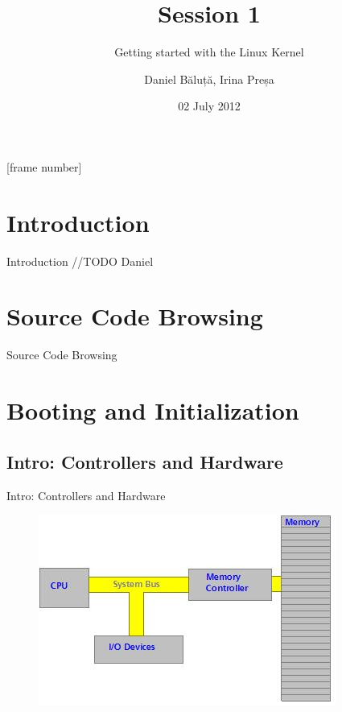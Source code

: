 \documentclass{workshop}
\title[Sesssion 1]{Session 1}
\subtitle{Getting started with the Linux Kernel}
\author{Daniel Băluță, Irina Preșa}
\date{02 July 2012}
\begin{document}
[frame number]

\frame{\titlepage}

\section{Introduction}

\begin{frame}{Introduction}
//TODO Daniel
\end{frame}

\section{Source Code Browsing}

\begin{frame}{Source Code Browsing}
\end{frame}

\section{Booting and Initialization}
\subsection{Intro: Controllers and Hardware}
\begin{frame}{Intro: Controllers and Hardware}
     \begin{figure}
         \includegraphics[scale=0.9]{img/bus.jpg}
      \end{figure}
\end{frame}
\end{document}
